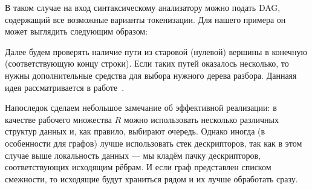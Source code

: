 В таком случае на вход синтаксическому анализатору можно подать DAG, содержащий все возможные варианты токенизации. Для нашего примера он может выглядить следующим образом:

\begin{center}
\end{center}

Далее будем проверять наличие пути из старовой (нулевой) вершины в конечную (соответствующую концу строки). Если таких путей оказалось несколько, то нужны дополнительные средства для выбора нужного дерева разбора. Даннаяя идея рассматривается в работе~\cite{10.1145/3357766.3359532}.

Напоследок сделаем небольшое замечание об эффективной реализации: в качестве рабочего множества $ R $ можно использовать несколько различных структур данных и, как правило, выбирают очередь. Однако иногда (в особенности для графов) лучше использовать стек дескрипторов, так как в этом случае выше локальность данных --- мы кладём пачку дескрипторов, соответствующих исходящим рёбрам. И если граф представлен списком смежности, то исходящие будут храниться рядом и их лучше обработать сразу.



